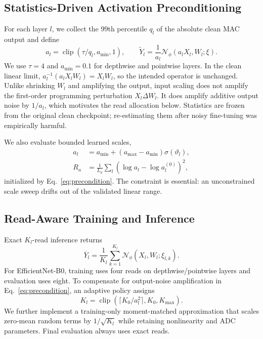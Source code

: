 \documentclass[10pt,twocolumn,letterpaper]{article}
\begin{document}
\subsection{Statistics-Driven Activation Preconditioning}
\label{sec:preconditioning}

For each layer $l$, we collect the 99th percentile $q_l$ of the absolute clean
MAC output and define
\begin{equation}
  a_l=\operatorname{clip}(\tau/q_l,a_{\min},1),\qquad
  \widetilde{Y}_l=\frac{1}{a_l}\mathcal{N}_{\phi}(a_lX_l,W_l;\xi).
  \label{eq:precondition}
\end{equation}
We use $\tau=4$ and $a_{\min}=0.1$ for depthwise and pointwise layers.  In the
clean linear limit, $a_l^{-1}(a_lX_lW_l)=X_lW_l$, so the intended operator is
unchanged.  Unlike shrinking $W_l$ and amplifying the output, input scaling
does not amplify the first-order programming perturbation $X_l\Delta W_l$.
It does amplify additive output noise by $1/a_l$, which motivates the read
allocation below.  Statistics are frozen from the original clean checkpoint;
re-estimating them after noisy fine-tuning was empirically harmful.

We also evaluate bounded learned scales,
\begin{equation}
\begin{aligned}
 a_l&=a_{\min}+(a_{\max}-a_{\min})\sigma(\vartheta_l),\\
 R_a&=\frac{1}{L_a}\sum_l(\log a_l-\log a_l^{(0)})^2,
\end{aligned}
 \label{eq:learned_scale}
\end{equation}
initialized by Eq.~\eqref{eq:precondition}.  The constraint is essential: an
unconstrained scale sweep drifts out of the validated linear range.

\subsection{Read-Aware Training and Inference}

Exact $K_l$-read inference returns
\begin{equation}
  \overline{Y}_l=\frac{1}{K_l}\sum_{k=1}^{K_l}
  \mathcal{N}_{\phi}(X_l,W_l;\xi_{l,k}).
  \label{eq:reads}
\end{equation}
For EfficientNet-B0, training uses four reads on depthwise/pointwise layers and
evaluation uses eight.  To compensate for output-noise amplification in
Eq.~\eqref{eq:precondition}, an adaptive policy assigns
\begin{equation}
  K_l=\operatorname{clip}(\lceil K_0/a_l^2\rceil,K_0,K_{\max}).
  \label{eq:read_budget}
\end{equation}
We further implement a training-only moment-matched approximation that scales
zero-mean random terms by $1/\sqrt{K_l}$ while retaining nonlinearity and ADC
parameters.  Final evaluation always uses exact reads.
\end{document}
